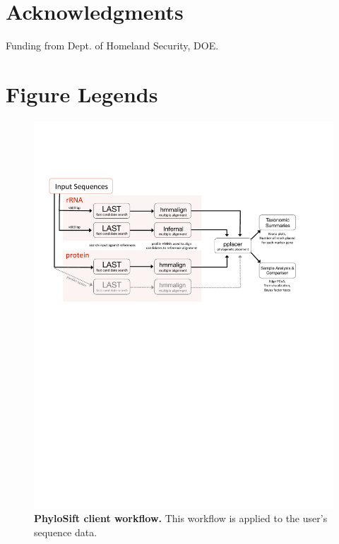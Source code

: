 \documentclass[10pt]{article}
\begin{document}
\section*{Acknowledgments}
Funding from Dept. of Homeland Security, DOE.



\clearpage

\section*{Figure Legends}
\begin{figure}[hp]
\begin{center}
\includegraphics[width=6.5in]{figures/Phylosift_overview_oct2012_vector.pdf}
\end{center}
\caption{\textbf{PhyloSift client workflow.} This workflow is applied to the user's sequence data.}
\label{fig:overview}
\end{figure}
\end{document}
